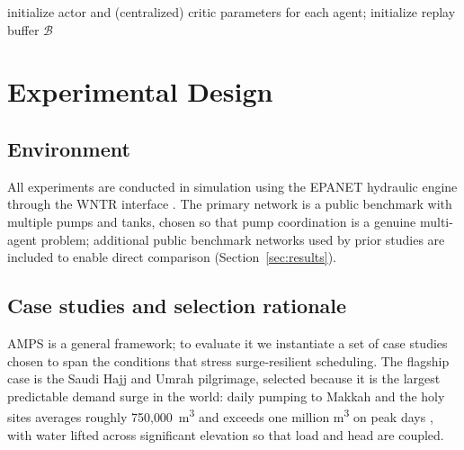 \documentclass[11pt,a4paper]{article}
\begin{document}
\begin{algorithm}[H]
\caption{AMPS training (centralized training, decentralized execution).}
\label{alg:train}
initialize actor and (centralized) critic parameters for each agent; initialize
replay buffer $\mathcal{B}$\;
\end{algorithm}

\section{Experimental Design}
\label{sec:expdesign}

\subsection{Environment}
All experiments are conducted in simulation using the EPANET hydraulic engine
\citep{Rossman2000EPANET} through the WNTR interface \citep{Klise2017WNTR}. The
primary network is a public benchmark with multiple pumps and tanks, chosen so
that pump coordination is a genuine multi-agent problem; additional public
benchmark networks used by prior studies are included to enable direct comparison
(Section~\ref{sec:results}).

\subsection{Case studies and selection rationale}
\label{sec:casestudies}
AMPS is a general framework; to evaluate it we instantiate a set of case studies
chosen to span the conditions that stress surge-resilient scheduling. The flagship
case is the Saudi Hajj and Umrah pilgrimage, selected because it is the largest
predictable demand surge in the world: daily pumping to Makkah and the holy sites
averages roughly 750{,}000~m\textsuperscript{3} and exceeds one million
m\textsuperscript{3} on peak days \citep{SWA2025HajjReadiness,NWC2025Madinah},
with water lifted across significant elevation so that load and head are coupled.
\end{document}
